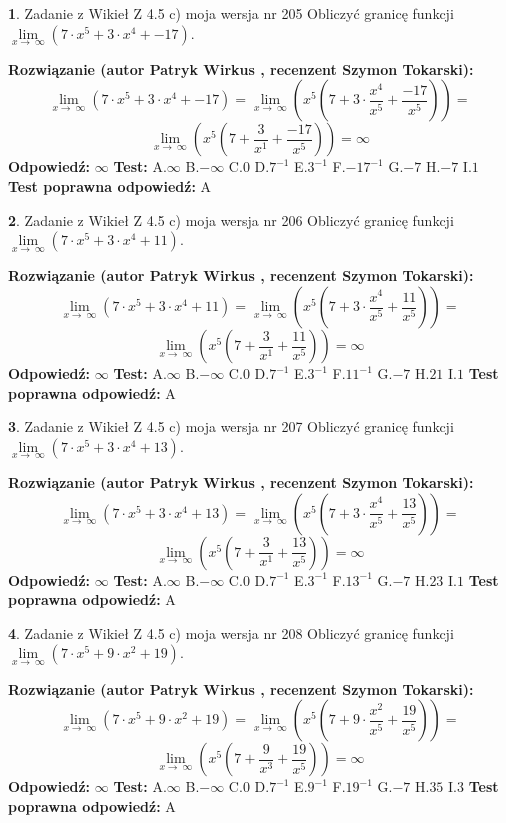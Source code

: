 \documentclass[12pt, a4paper]{article}
\theoremstyle{definition} %
\newtheorem{zad}{}
\newcommand{\zadStart}[1]{\begin{zad}#1\newline}
\newcommand{\zadStop}{\end{zad}}
\newcommand{\rozwStart}[2]{\noindent \textbf{Rozwiązanie (autor #1 , recenzent #2): }\newline}
\newcommand{\rozwStop}{\newline}
\newcommand{\odpStart}{\noindent \textbf{Odpowiedź:}\newline}
\newcommand{\odpStop}{\newline}
\newcommand{\testStart}{\noindent \textbf{Test:}\newline}
\newcommand{\testStop}{\newline}
\newcommand{\kluczStart}{\noindent \textbf{Test poprawna odpowiedź:}\newline}
\newcommand{\kluczStop}{\newline}
\begin{document}
\zadStart{Zadanie z Wikieł Z 4.5 c) moja wersja nr 205}
Obliczyć granicę funkcji  $\lim\limits_{x\to\ \infty}(7 \cdot x^{5}+3 \cdot x^{4}+-17)$.
\zadStop
\rozwStart{Patryk Wirkus}{Szymon Tokarski}
$$\lim\limits_{x\to\ \infty}(7 \cdot x^{5}+3 \cdot x^{4}+-17) = \lim\limits_{x\to\ \infty}(x^{5}(7 +3 \cdot \frac{x^{4}}{x^{5}}+\frac{-17}{x^{5}})) =$$ $$\lim\limits_{x\to\ \infty}(x^{5}(7 +\frac{3}{x^{1}}+\frac{-17}{x^{5}})) =\infty$$
\rozwStop
\odpStart
$\infty$
\odpStop
\testStart
A.$\infty$ B.$-\infty$ C.$0$ D.$7^{-1}$ E.$3^{-1}$
F.$-17^{-1}$ G.$-7$
H.$-7$
I.$1$
\testStop
\kluczStart
A
\kluczStop



\zadStart{Zadanie z Wikieł Z 4.5 c) moja wersja nr 206}
Obliczyć granicę funkcji  $\lim\limits_{x\to\ \infty}(7 \cdot x^{5}+3 \cdot x^{4}+11)$.
\zadStop
\rozwStart{Patryk Wirkus}{Szymon Tokarski}
$$\lim\limits_{x\to\ \infty}(7 \cdot x^{5}+3 \cdot x^{4}+11) = \lim\limits_{x\to\ \infty}(x^{5}(7 +3 \cdot \frac{x^{4}}{x^{5}}+\frac{11}{x^{5}})) =$$ $$\lim\limits_{x\to\ \infty}(x^{5}(7 +\frac{3}{x^{1}}+\frac{11}{x^{5}})) =\infty$$
\rozwStop
\odpStart
$\infty$
\odpStop
\testStart
A.$\infty$ B.$-\infty$ C.$0$ D.$7^{-1}$ E.$3^{-1}$
F.$11^{-1}$ G.$-7$
H.$21$
I.$1$
\testStop
\kluczStart
A
\kluczStop



\zadStart{Zadanie z Wikieł Z 4.5 c) moja wersja nr 207}
Obliczyć granicę funkcji  $\lim\limits_{x\to\ \infty}(7 \cdot x^{5}+3 \cdot x^{4}+13)$.
\zadStop
\rozwStart{Patryk Wirkus}{Szymon Tokarski}
$$\lim\limits_{x\to\ \infty}(7 \cdot x^{5}+3 \cdot x^{4}+13) = \lim\limits_{x\to\ \infty}(x^{5}(7 +3 \cdot \frac{x^{4}}{x^{5}}+\frac{13}{x^{5}})) =$$ $$\lim\limits_{x\to\ \infty}(x^{5}(7 +\frac{3}{x^{1}}+\frac{13}{x^{5}})) =\infty$$
\rozwStop
\odpStart
$\infty$
\odpStop
\testStart
A.$\infty$ B.$-\infty$ C.$0$ D.$7^{-1}$ E.$3^{-1}$
F.$13^{-1}$ G.$-7$
H.$23$
I.$1$
\testStop
\kluczStart
A
\kluczStop



\zadStart{Zadanie z Wikieł Z 4.5 c) moja wersja nr 208}
Obliczyć granicę funkcji  $\lim\limits_{x\to\ \infty}(7 \cdot x^{5}+9 \cdot x^{2}+19)$.
\zadStop
\rozwStart{Patryk Wirkus}{Szymon Tokarski}
$$\lim\limits_{x\to\ \infty}(7 \cdot x^{5}+9 \cdot x^{2}+19) = \lim\limits_{x\to\ \infty}(x^{5}(7 +9 \cdot \frac{x^{2}}{x^{5}}+\frac{19}{x^{5}})) =$$ $$\lim\limits_{x\to\ \infty}(x^{5}(7 +\frac{9}{x^{3}}+\frac{19}{x^{5}})) =\infty$$
\rozwStop
\odpStart
$\infty$
\odpStop
\testStart
A.$\infty$ B.$-\infty$ C.$0$ D.$7^{-1}$ E.$9^{-1}$
F.$19^{-1}$ G.$-7$
H.$35$
I.$3$
\testStop
\kluczStart
A
\kluczStop
\end{document}
